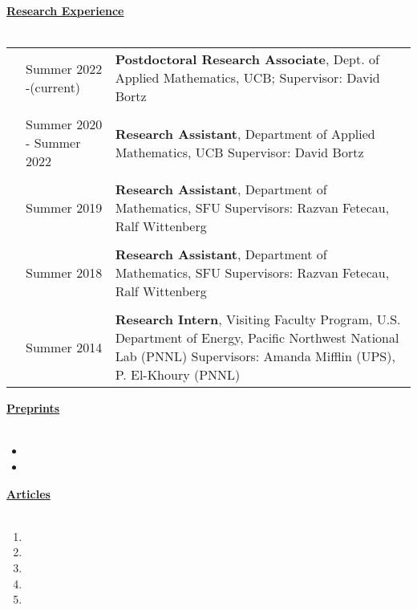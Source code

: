 \documentclass[letterpaper,11pt,oneside]{article}
\newcommand{\headr}[1]{\vspace{10pt}\uline{\Large{\textbf{#1}} \hfill } \\ \vspace{-10pt}\\}
\begin{document}
\headr{Research Experience}

\begin{tabular}{@{} p{0.01cm} p{2.5cm} p{12cm}}
& Summer 2022 -\newline (current)  & 
\textbf{Postdoctoral Research Associate}, Dept. of Applied Mathematics, UCB;
Supervisor: David Bortz \\
& & \\
& Summer 2020 - \newline Summer 2022  & 
\textbf{Research Assistant}, Department of Applied Mathematics, UCB \newline
Supervisor: David Bortz \\
&     & \\
& Summer 2019  & 
\textbf{Research Assistant}, Department of Mathematics, SFU
\newline Supervisors: Razvan Fetecau, Ralf Wittenberg \\
&     & \\
& Summer 2018  & 
\textbf{Research Assistant}, Department of Mathematics, SFU
\newline Supervisors: Razvan Fetecau, Ralf Wittenberg \\
&     & \\
& Summer 2014  & 
\textbf{Research Intern},  Visiting Faculty Program, U.S. Department of Energy, Pacific Northwest National Lab (PNNL)
\newline Supervisors: Amanda Mifflin (UPS), P. El-Khoury (PNNL) 
\end{tabular}




\headr{Preprints}

\begin{itemize}
\item {}
\item {}
\end{itemize}
\newpage
\headr{Articles}

\begin{enumerate}
\item {}
\item {}
\item {}
\item {}
\item {}
\end{enumerate}
\end{document}
